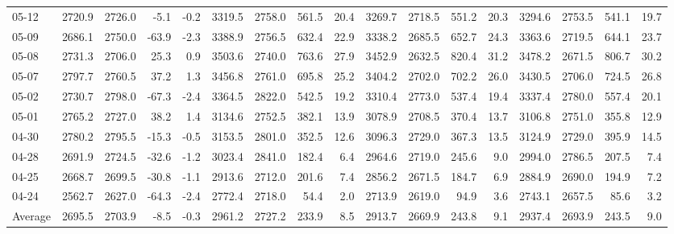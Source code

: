 \begin{threeparttable}
{\begin{tabular}{lrrrrrrrrrrrrrrrr}
  05-12 & 2720.9 & 2726.0 &       -5.1 &           -0.2 & 3319.5 & 2758.0 &      561.5 &           20.4 & 3269.7 & 2718.5 &      551.2 &           20.3 & 3294.6 & 2753.5 &       541.1 &             19.7 \\
  05-09 & 2686.1 & 2750.0 &      -63.9 &           -2.3 & 3388.9 & 2756.5 &      632.4 &           22.9 & 3338.2 & 2685.5 &      652.7 &           24.3 & 3363.6 & 2719.5 &       644.1 &             23.7 \\
  05-08 & 2731.3 & 2706.0 &       25.3 &            0.9 & 3503.6 & 2740.0 &      763.6 &           27.9 & 3452.9 & 2632.5 &      820.4 &           31.2 & 3478.2 & 2671.5 &       806.7 &             30.2 \\
  05-07 & 2797.7 & 2760.5 &       37.2 &            1.3 & 3456.8 & 2761.0 &      695.8 &           25.2 & 3404.2 & 2702.0 &      702.2 &           26.0 & 3430.5 & 2706.0 &       724.5 &             26.8 \\
  05-02 & 2730.7 & 2798.0 &      -67.3 &           -2.4 & 3364.5 & 2822.0 &      542.5 &           19.2 & 3310.4 & 2773.0 &      537.4 &           19.4 & 3337.4 & 2780.0 &       557.4 &             20.1 \\
  05-01 & 2765.2 & 2727.0 &       38.2 &            1.4 & 3134.6 & 2752.5 &      382.1 &           13.9 & 3078.9 & 2708.5 &      370.4 &           13.7 & 3106.8 & 2751.0 &       355.8 &             12.9 \\
  04-30 & 2780.2 & 2795.5 &      -15.3 &           -0.5 & 3153.5 & 2801.0 &      352.5 &           12.6 & 3096.3 & 2729.0 &      367.3 &           13.5 & 3124.9 & 2729.0 &       395.9 &             14.5 \\
  04-28 & 2691.9 & 2724.5 &      -32.6 &           -1.2 & 3023.4 & 2841.0 &      182.4 &            6.4 & 2964.6 & 2719.0 &      245.6 &            9.0 & 2994.0 & 2786.5 &       207.5 &              7.4 \\
  04-25 & 2668.7 & 2699.5 &      -30.8 &           -1.1 & 2913.6 & 2712.0 &      201.6 &            7.4 & 2856.2 & 2671.5 &      184.7 &            6.9 & 2884.9 & 2690.0 &       194.9 &              7.2 \\
  04-24 & 2562.7 & 2627.0 &      -64.3 &           -2.4 & 2772.4 & 2718.0 &       54.4 &            2.0 & 2713.9 & 2619.0 &       94.9 &            3.6 & 2743.1 & 2657.5 &        85.6 &              3.2 \\
Average & 2695.5 & 2703.9 &       -8.5 &           -0.3 & 2961.2 & 2727.2 &      233.9 &            8.5 & 2913.7 & 2669.9 &      243.8 &            9.1 & 2937.4 & 2693.9 &       243.5 &              9.0 \\

\end{tabular}}
\end{threeparttable}
